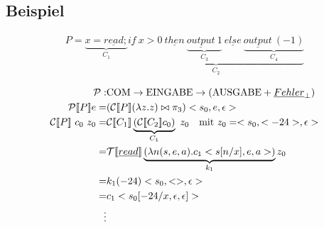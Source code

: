 \subsection{Beispiel}
\begin{align*}
P = \underbrace{x = \underline{read};}_{C_1}\underbrace{\underline{if}\ x>0 \ \underline{then}\ \underbrace{\underline{output}\ 1}_{C_3}\ \underline{else}\ \underbrace{\underline{output}\ (-1)}_{C_4}}_{C_2}\\
\end{align*}
\begin{align*}
\mathcal{P}: & \text{\lstinline!COM!} \rightarrow \text{\lstinline!EINGABE!} \rightarrow (\text{\lstinline!AUSGABE!} + {\underline{Fehler}_\perp}) \\
\mathcal{P}[\![ P ]\!] e = & (\mathcal{C}[\![ P ]\!] (\lambda z.z) \bowtie \pi_3) <s_0,e, \epsilon>\\
\mathcal{C}[\![ P ]\!]\ c_0 \ z_0 = & \mathcal{C}[\![ C_1 ]\!] \underbrace{ (\mathcal{C}[\![ C_2 ]\!] c_0)}_{C_1}\ z_0 \quad \text{mit } z_0 = <s_0, <-24>,\epsilon>\\
=& \mathcal{T}[\![ \underline{read} ]\!] \underbrace{(\lambda n (s,e,a).c_1<s[n/x],e,a>)}_{k_1} z_0\\
=& k_1 (-24) <s_0,<>,\epsilon>\\
=& c_1 <s_0[-24/x,\epsilon,\epsilon]>\\
\vdots\\
\end{align*}